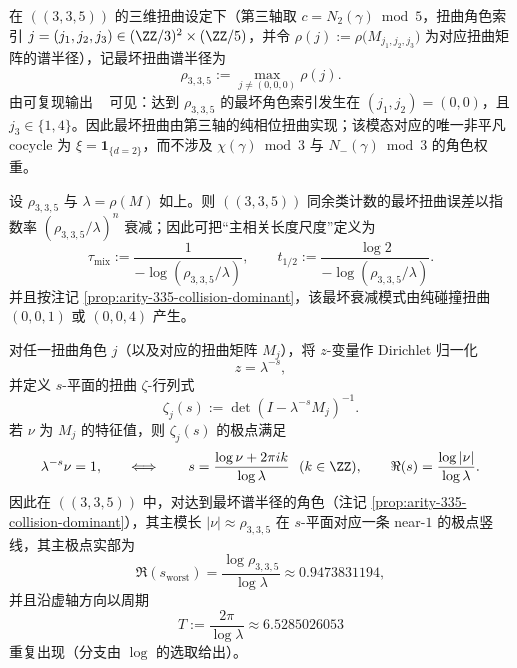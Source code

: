 \begin{remark}\label{prop:arity-335-collision-dominant}
在 \(((3,3,5))\) 的三维扭曲设定下（第三轴取 $c=N_2(\gamma)\bmod 5$，扭曲角色索引 $j=(j_1,j_2,j_3)\in(\ZZ/3)^2\times(\ZZ/5)$，并令
\(
\rho(j):=\rho\bigl(M_{j_1,j_2,j_3}\bigr)
\)
为对应扭曲矩阵的谱半径），记最坏扭曲谱半径为
$$
\rho_{3,3,5}:=\max_{j\neq (0,0,0)}\rho(j).
$$
由可复现输出
\verb||\ 
可见：达到 $\rho_{3,3,5}$ 的最坏角色索引发生在 $(j_1,j_2)=(0,0)$，且 $j_3\in\{1,4\}$。因此最坏扭曲由第三轴的纯相位扭曲实现；该模态对应的唯一非平凡 cocycle 为
\(
\xi=\mathbf{1}_{\{d=2\}}
\)，而不涉及 $\chi(\gamma)\bmod 3$ 与 $N_-(\gamma)\bmod 3$ 的角色权重。
\end{remark}

\begin{remark}\label{cor:arity-335-collision-mixing-scale}
设 \(\rho_{3,3,5}\) 与 \(\lambda=\rho(M)\) 如上。则 \(((3,3,5))\) 同余类计数的最坏扭曲误差以指数率
\(
(\rho_{3,3,5}/\lambda)^n
\)
衰减；因此可把“主相关长度尺度”定义为
$$
\tau_{\mathrm{mix}}:=\frac{1}{-\log(\rho_{3,3,5}/\lambda)},
\qquad
t_{1/2}:=\frac{\log 2}{-\log(\rho_{3,3,5}/\lambda)}.
$$
并且按注记 \ref{prop:arity-335-collision-dominant}，该最坏衰减模式由纯碰撞扭曲 $(0,0,1)$ 或 $(0,0,4)$ 产生。
\end{remark}

\begin{remark}\label{rem:arity-335-near1-pole-line}
对任一扭曲角色 \(j\)（以及对应的扭曲矩阵 \(M_j\)），将 \(z\)-变量作 Dirichlet 归一化
\[
z=\lambda^{-s},
\]
并定义 \(s\)-平面的扭曲 \(\zeta\)-行列式
\[
\zeta_j(s):=\det(I-\lambda^{-s}M_j)^{-1}.
\]
若 \(\nu\) 为 \(M_j\) 的特征值，则 \(\zeta_j(s)\) 的极点满足
\[
\lambda^{-s}\nu=1,
\qquad\Longleftrightarrow\qquad
s=\frac{\log \nu+2\pi i k}{\log\lambda}\ \ (k\in\ZZ),
\qquad
\Re(s)=\frac{\log|\nu|}{\log\lambda}.
\]
因此在 \(((3,3,5))\) 中，对达到最坏谱半径的角色（注记 \ref{prop:arity-335-collision-dominant}），其主模长 \(|\nu|\approx \rho_{3,3,5}\) 在 \(s\)-平面对应一条 near-\(1\) 的极点竖线，其主极点实部为
$$
\Re(s_{\mathrm{worst}})=\frac{\log\rho_{3,3,5}}{\log\lambda}\approx 0.9473831194,
$$
并且沿虚轴方向以周期
$$
T:=\frac{2\pi}{\log\lambda}\approx 6.5285026053
$$
重复出现（分支由 \(\log\) 的选取给出）。
\end{remark}

